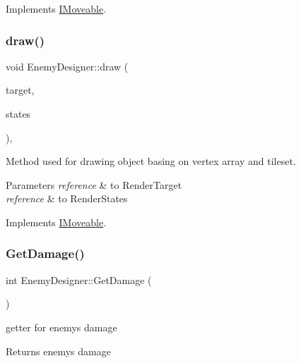 Implements \mbox{\hyperlink{class_i_moveable}{I\+Moveable}}.

\mbox{\label{class_enemy_designer_ab496f15186e05c356bbdb7931fed56b6}} 
\subsubsection{\texorpdfstring{draw()}{draw()}}
{\footnotesize\ttfamily void Enemy\+Designer\+::draw (\begin{DoxyParamCaption}\item[{sf\+::\+Render\+Target \&}]{target,  }\item[{sf\+::\+Render\+States}]{states }\end{DoxyParamCaption})\hspace{0.3cm}{\ttfamily [override]}, {\ttfamily [virtual]}}



Method used for drawing object basing on vertex array and tileset. 


\begin{DoxyParams}{Parameters}
{\em reference} & to Render\+Target \\
\hline
{\em reference} & to Render\+States \\
\hline
\end{DoxyParams}


Implements \mbox{\hyperlink{class_i_moveable}{I\+Moveable}}.

\mbox{\label{class_enemy_designer_a6c612e70cef0534946c54f302f63a970}} 
\subsubsection{\texorpdfstring{Get\+Damage()}{GetDamage()}}
{\footnotesize\ttfamily int Enemy\+Designer\+::\+Get\+Damage (\begin{DoxyParamCaption}{ }\end{DoxyParamCaption})}



getter for enemy\textquotesingle{}s damage 

\begin{DoxyReturn}{Returns}
enemy\textquotesingle{}s damage 
\end{DoxyReturn}
\mbox{\label{class_enemy_designer_a699a16e808c173c28dc7be7c05386ea1}} 
